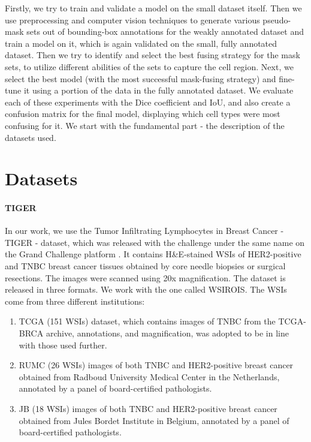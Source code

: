 Firstly, we try to train and validate a model on the small dataset itself. Then we use preprocessing and computer vision techniques to generate various pseudo-mask sets out of bounding-box annotations for the weakly annotated dataset and train a model on it, which is again validated on the small, fully annotated dataset. Then we try to identify and select the best fusing strategy for the mask sets, to utilize different abilities of the sets to capture the cell region. Next, we select the best model (with the most successful mask-fusing strategy) and fine-tune it using a portion of the data in the fully annotated dataset. We evaluate each of these experiments with the Dice coefficient and IoU, and also create a confusion matrix for the final model, displaying which cell types were most confusing for it. We start with the fundamental part - the description of the datasets used.

\section{Datasets}
\label{sec:datasets}

\paragraph{TIGER} In our work, we use the Tumor Infiltrating Lymphocytes in Breast Cancer - TIGER - dataset, which was released with the challenge under the same name on the Grand Challenge platform \cite{tiger_dataset}. It contains H\&E-stained WSIs of HER2-positive and TNBC breast cancer tissues obtained by core needle biopsies or surgical resections. The images were scanned using 20x magnification. The dataset is released in three formats. We work with the one called WSIROIS. The WSIs come from three different institutions:

\begin{enumerate}
    \item TCGA (151 WSIs) dataset, which contains images of TNBC from the TCGA-BRCA archive, annotations, and magnification, was adopted to be in line with those used further.
    \item RUMC (26 WSIs) images of both TNBC and HER2-positive breast cancer obtained from Radboud University Medical Center in the Netherlands, annotated by a panel of board-certified pathologists.
    \item JB (18 WSIs) images of both TNBC and HER2-positive breast cancer obtained from Jules Bordet Institute in Belgium, annotated by a panel of board-certified pathologists.
\end{enumerate}

